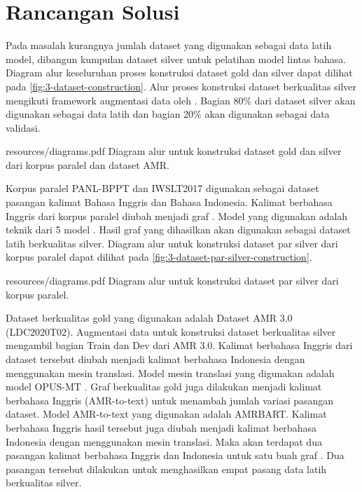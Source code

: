 \section{Rancangan Solusi}

Pada masalah kurangnya jumlah dataset yang digunakan sebagai data latih model, dibangun kumpulan dataset silver untuk pelatihan model \amrparsing{} lintas bahasa.
Diagram alur keseluruhan proses konstruksi dataset gold dan silver dapat dilihat pada \cref{fig:3-dataset-construction}.
Alur proses konstruksi dataset berkualitas silver mengikuti framework augmentasi data oleh \textcite{lee2022}.
Bagian 80\% dari dataset silver akan digunakan sebagai data latih dan bagian 20\% akan digunakan sebagai data validasi.

  {resources/diagrams.pdf}
  {Diagram alur untuk konstruksi dataset gold dan silver dari korpus paralel dan dataset AMR.}

Korpus paralel PANL-BPPT dan IWSLT2017 digunakan sebagai dataset pasangan kalimat Bahasa Inggris dan Bahasa Indonesia.
Kalimat berbahasa Inggris dari korpus paralel diubah menjadi graf \AMR{}.
Model \amrparsing{} yang digunakan adalah teknik  dari 5 model \sota{} .
Hasil graf \AMR{} yang dihasilkan akan digunakan sebagai dataset latih berkualitas silver.
Diagram alur untuk konstruksi dataset par silver dari korpus paralel dapat dilihat pada \cref{fig:3-dataset-par-silver-construction}.

  {resources/diagrams.pdf}
  {Diagram alur untuk konstruksi dataset par silver dari korpus paralel.}

Dataset \AMR{} berkualitas gold yang digunakan adalah Dataset AMR 3.0 (LDC2020T02).
Augmentasi data untuk konstruksi dataset berkualitas silver mengambil bagian Train dan Dev  dari AMR 3.0.
Kalimat berbahasa Inggris dari dataset \AMR{} tersebut diubah menjadi kalimat berbahasa Indonesia dengan menggunakan mesin translasi.
Model mesin translasi yang digunakan adalah model {OPUS-MT} .
Graf \AMR{} berkualitas gold juga dilakukan  menjadi kalimat berbahasa Inggris (AMR-to-text) untuk menambah jumlah variasi pasangan dataset.
Model AMR-to-text yang digunakan adalah \gls{AMRBART}.
Kalimat berbahasa Inggris hasil  tersebut juga diubah menjadi kalimat berbahasa Indonesia dengan menggunakan mesin translasi.
Maka akan terdapat dua pasangan kalimat berbahasa Inggris dan Indonesia untuk satu buah graf \AMR{}.
Dua pasangan tersebut dilakukan  untuk menghasilkan empat pasang data latih berkualitas silver.

